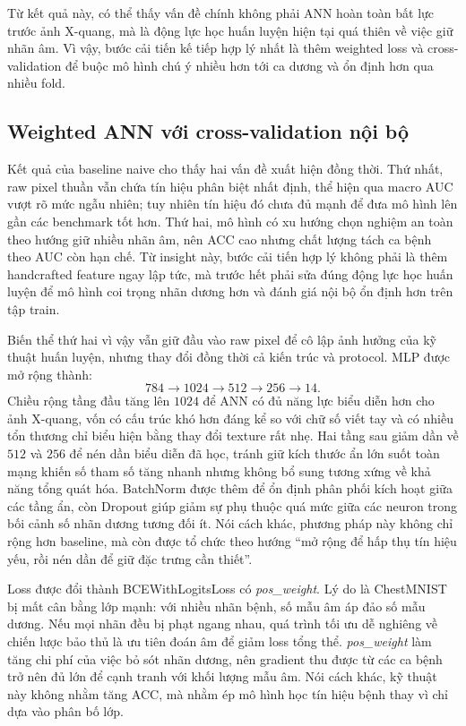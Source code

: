 Từ kết quả này, có thể thấy vấn đề chính không phải ANN hoàn toàn bất lực trước ảnh X-quang, mà là động lực học huấn luyện hiện tại quá thiên về việc giữ nhãn âm. Vì vậy, bước cải tiến kế tiếp hợp lý nhất là thêm weighted loss và cross-validation để buộc mô hình chú ý nhiều hơn tới ca dương và ổn định hơn qua nhiều fold.

\subsection{Weighted ANN với cross-validation nội bộ}

Kết quả của baseline naive cho thấy hai vấn đề xuất hiện đồng thời. Thứ nhất, raw pixel thuần vẫn chứa tín hiệu phân biệt nhất định, thể hiện qua macro AUC vượt rõ mức ngẫu nhiên; tuy nhiên tín hiệu đó chưa đủ mạnh để đưa mô hình lên gần các benchmark tốt hơn. Thứ hai, mô hình có xu hướng chọn nghiệm an toàn theo hướng giữ nhiều nhãn âm, nên ACC cao nhưng chất lượng tách ca bệnh theo AUC còn hạn chế. Từ insight này, bước cải tiến hợp lý không phải là thêm handcrafted feature ngay lập tức, mà trước hết phải sửa đúng động lực học huấn luyện để mô hình coi trọng nhãn dương hơn và đánh giá nội bộ ổn định hơn trên tập train.

Biến thể thứ hai vì vậy vẫn giữ đầu vào raw pixel để cô lập ảnh hưởng của kỹ thuật huấn luyện, nhưng thay đổi đồng thời cả kiến trúc và protocol. MLP được mở rộng thành:
\[
784 \rightarrow 1024 \rightarrow 512 \rightarrow 256 \rightarrow 14.
\]
Chiều rộng tầng đầu tăng lên $1024$ để ANN có đủ năng lực biểu diễn hơn cho ảnh X-quang, vốn có cấu trúc khó hơn đáng kể so với chữ số viết tay và có nhiều tổn thương chỉ biểu hiện bằng thay đổi texture rất nhẹ. Hai tầng sau giảm dần về $512$ và $256$ để nén dần biểu diễn đã học, tránh giữ kích thước ẩn lớn suốt toàn mạng khiến số tham số tăng nhanh nhưng không bổ sung tương xứng về khả năng tổng quát hóa. BatchNorm được thêm để ổn định phân phối kích hoạt giữa các tầng ẩn, còn Dropout giúp giảm sự phụ thuộc quá mức giữa các neuron trong bối cảnh số nhãn dương tương đối ít. Nói cách khác, phương pháp này không chỉ rộng hơn baseline, mà còn được tổ chức theo hướng “mở rộng để hấp thụ tín hiệu yếu, rồi nén dần để giữ đặc trưng cần thiết”.

Loss được đổi thành BCEWithLogitsLoss có \textit{pos\_weight}. Lý do là ChestMNIST bị mất cân bằng lớp mạnh: với nhiều nhãn bệnh, số mẫu âm áp đảo số mẫu dương. Nếu mọi nhãn đều bị phạt ngang nhau, quá trình tối ưu dễ nghiêng về chiến lược bảo thủ là ưu tiên đoán âm để giảm loss tổng thể. \textit{pos\_weight} làm tăng chi phí của việc bỏ sót nhãn dương, nên gradient thu được từ các ca bệnh trở nên đủ lớn để cạnh tranh với khối lượng mẫu âm. Nói cách khác, kỹ thuật này không nhằm tăng ACC, mà nhằm ép mô hình học tín hiệu bệnh thay vì chỉ dựa vào phân bố lớp.

